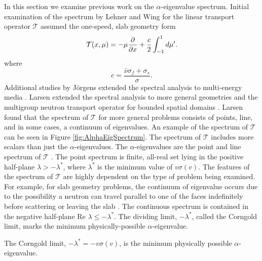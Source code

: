 In this section we examine previous work on the $\alpha$-eigenvalue spectrum. Initial examination of the spectrum by Lehner and Wing \cite{lehner_spectrum_1955} for the linear transport operator $\mathcal{T}$ assumed the one-speed, slab geometry form
\begin{equation}
	\mathcal{T}(x,\mu) = -\mu \frac{\partial}{\partial x} + \frac{c}{2} \int_{-1}^{1} \mathop{}\!d \mu'.
\end{equation}
where
\begin{equation}
	c = \frac{\bar{\nu} \sigma_{f} + \sigma_{s}}{\sigma}.
\end{equation}
Additional studies by J{\"o}rgens extended the spectral analysis to multi-energy media \cite{jorgens_asymptotic_1958}. Larsen extended the spectral analysis to more general geometries \cite{larsen_spectrum_1974} and the multigroup neutron transport operator for bounded spatial domains \cite{larsen_spectrum_1979}. Larsen found that the spectrum of $\mathcal{T}$ for more general problems consists of points, line, and in some cases, a continuum of eigenvalues. An example of the spectrum of $\mathcal{T}$ can be seen in Figure \ref{fig:AlphaEigSpectrum}. The spectrum of $\mathcal{T}$ includes more scalars than just the $\alpha$-eigenvalues. The $\alpha$-eigenvalues are the point and line spectrum of $\mathcal{T}$ \cite{duderstadt_transport_1979}. The point spectrum is finite, all-real set lying in the positive half-plane $\lambda > -\lambda^{*}$, where $\lambda^{*}$ is the minimum value of $v\sigma(v)$. The features of the spectrum of $\mathcal{T}$ are highly dependent on the type of problem being examined. For example, for slab geometry problems, the continuum of eigenvalue occurs due to the possibility a neutron can travel parallel to one of the faces indefinitely before scattering or leaving the slab \cite{wing_transport_1962}. The continuous spectrum is contained in the negative half-plane Re $\lambda \le -\lambda^{*}$. The dividing limit, $-\lambda^{*}$, called the Corngold limit, marks the minimum physically-possible $\alpha$-eigenvalue.

\begin{theorem}
	The Corngold limit, $-\lambda^{*} = -v\sigma(v)$, is the minimum physically possible $\alpha$-eigenvalue.
\end{theorem}

